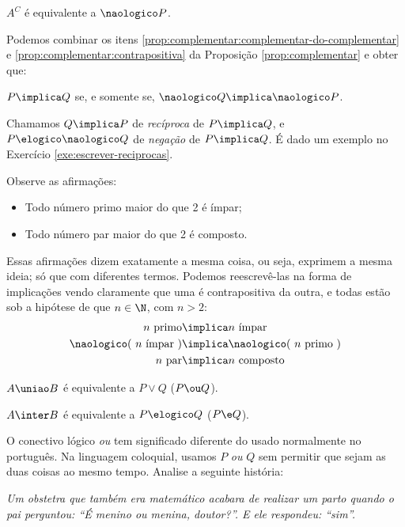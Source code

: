 \begin{proposition} 
	$A^C$ é equivalente a $\naologico P$.
\end{proposition}

Podemos combinar os itens \ref{prop:complementar:complementar-do-complementar} e \ref{prop:complementar:contrapositiva} da Proposição \ref{prop:complementar} e obter que:
\begin{center}
    $P \implica Q$ se, e somente se, $\naologico Q \implica \naologico P$.
\end{center}

Chamamos $Q \implica P$ de \emph{recíproca} de $P \implica Q$, e $P \elogico \naologico Q$ de \emph{negação} de $P \implica Q$. É dado um exemplo no Exercício \ref{exe:escrever-reciprocas}.

\begin{example}
	Observe as afirmações:
	
	\begin{itemize}
		\item Todo número primo maior do que 2 é ímpar;
		\item Todo número par maior do que 2 é composto.
	\end{itemize}

	Essas afirmações dizem exatamente a mesma coisa, ou seja, exprimem a mesma ideia; só que com diferentes termos. Podemos reescrevê-las na forma de implicações vendo claramente que uma é contrapositiva da outra, e todas estão sob a hipótese de que $n \in \N$, com $n > 2$:    
    \begin{align*}
        \text{$n$ primo}                   &\implica \text{$n$ ímpar} \\
        \text{$\naologico$( $n$ ímpar )}   &\implica \text{$\naologico$( $n$ primo )} \\
        \text{$n$ par}                     &\implica \text{$n$ composto}
    \end{align*}
\end{example}

\begin{proposition}
	$A \uniao B$ é equivalente a $P \lor Q$ ($P \ou Q$).
\end{proposition}

\begin{proposition}
	$A \inter B$ é equivalente a $P \elogico Q$ ($P \e Q$).
\end{proposition}

\begin{remark}
    O conectivo lógico \textit{ou} tem significado diferente do usado normalmente no português. Na linguagem coloquial, usamos $P$ \textit{ou} $Q$ sem permitir que sejam as duas coisas ao mesmo tempo. Analise a seguinte história:

    \emph{Um obstetra que também era matemático acabara de realizar um parto quando o pai perguntou: ``É menino ou menina, doutor?''. E ele respondeu: ``sim''.}
\end{remark}

